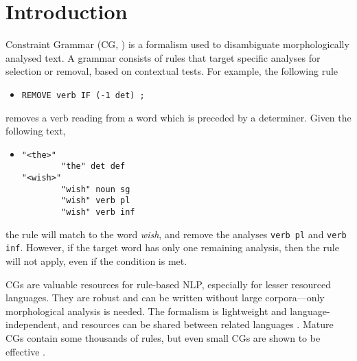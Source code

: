 \section{Introduction}
\label{sec:intro}



Constraint Grammar (CG, )
is a formalism used to disambiguate morphologically analysed text. 
A grammar consists of rules that target specific analyses for selection or removal, based on contextual tests. For example, the following rule
\begin{itemize}
\item[] \texttt{REMOVE verb IF (-1 det) ;}
\end{itemize}
removes a verb reading from a word which is preceded by a determiner.
Given the following text,
\begin{itemize}
\item[] 
\begin{verbatim}
"<the>"
        "the" det def
"<wish>"
        "wish" noun sg
        "wish" verb pl
        "wish" verb inf
\end{verbatim}
\end{itemize}
the rule will match to the word \emph{wish}, and remove the analyses \texttt{verb pl} and \texttt{verb inf}.
However, if the target word has only one remaining analysis, then the rule will not apply, even if the condition is met.

CGs are valuable resources for rule-based NLP, especially for lesser
resourced languages. They are robust and can be written without large
corpora---only morphological analysis is needed. The formalism is
lightweight and language-independent, and resources can be shared
between related languages \cite{bick2006spanish,lene_trond_linda2010}.
Mature CGs contain some thousands of rules, but even small CGs are shown to be effective \cite{lene_trond2011}.


